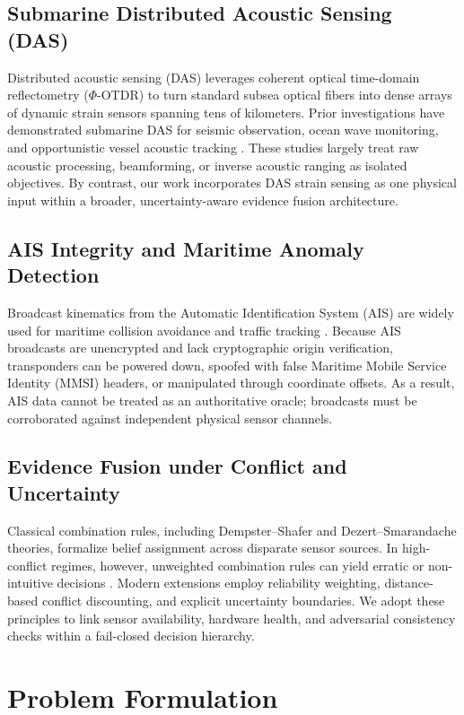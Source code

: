 \documentclass[conference]{IEEEtran}
\begin{document}
\subsection{Submarine Distributed Acoustic Sensing (DAS)}
Distributed acoustic sensing (DAS) leverages coherent optical time-domain reflectometry ($\Phi$-OTDR) to turn standard subsea optical fibers into dense arrays of dynamic strain sensors spanning tens of kilometers. Prior investigations have demonstrated submarine DAS for seismic observation, ocean wave monitoring, and opportunistic vessel acoustic tracking \cite{b11,b12,b13,b14,b15}. These studies largely treat raw acoustic processing, beamforming, or inverse acoustic ranging as isolated objectives. By contrast, our work incorporates DAS strain sensing as one physical input within a broader, uncertainty-aware evidence fusion architecture.

\subsection{AIS Integrity and Maritime Anomaly Detection}
Broadcast kinematics from the Automatic Identification System (AIS) are widely used for maritime collision avoidance and traffic tracking \cite{b5,b6,b7}. Because AIS broadcasts are unencrypted and lack cryptographic origin verification, transponders can be powered down, spoofed with false Maritime Mobile Service Identity (MMSI) headers, or manipulated through coordinate offsets. As a result, AIS data cannot be treated as an authoritative oracle; broadcasts must be corroborated against independent physical sensor channels.

\subsection{Evidence Fusion under Conflict and Uncertainty}
Classical combination rules, including Dempster--Shafer and Dezert--Smarandache theories, formalize belief assignment across disparate sensor sources. In high-conflict regimes, however, unweighted combination rules can yield erratic or non-intuitive decisions \cite{b8,b9,b10}. Modern extensions employ reliability weighting, distance-based conflict discounting, and explicit uncertainty boundaries. We adopt these principles to link sensor availability, hardware health, and adversarial consistency checks within a fail-closed decision hierarchy.

\section{Problem Formulation}
\end{document}
